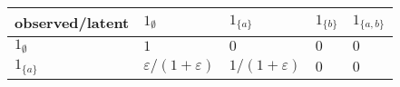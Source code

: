 \documentclass[
]{article}
\begin{document}
\begin{longtable}[]{@{}lllll@{}}
\toprule
\begin{minipage}[b]{0.10\columnwidth}\raggedright
observed/latent\strut
\end{minipage} & \begin{minipage}[b]{0.21\columnwidth}\raggedright
\(1_\emptyset\)\strut
\end{minipage} & \begin{minipage}[b]{0.20\columnwidth}\raggedright
\(1_{\{a\}}\)\strut
\end{minipage} & \begin{minipage}[b]{0.20\columnwidth}\raggedright
\(1_{\{b\}}\)\strut
\end{minipage} & \begin{minipage}[b]{0.14\columnwidth}\raggedright
\(1_{\{a,b\}}\)\strut
\end{minipage}\tabularnewline
\midrule
\endhead
\begin{minipage}[t]{0.10\columnwidth}\raggedright
\(1_\emptyset\)\strut
\end{minipage} & \begin{minipage}[t]{0.21\columnwidth}\raggedright
\(1\)\strut
\end{minipage} & \begin{minipage}[t]{0.20\columnwidth}\raggedright
\(0\)\strut
\end{minipage} & \begin{minipage}[t]{0.20\columnwidth}\raggedright
\(0\)\strut
\end{minipage} & \begin{minipage}[t]{0.14\columnwidth}\raggedright
\(0\)\strut
\end{minipage}\tabularnewline
\begin{minipage}[t]{0.10\columnwidth}\raggedright
\(1_{\{a\}}\)\strut
\end{minipage} & \begin{minipage}[t]{0.21\columnwidth}\raggedright
\(\varepsilon/(1+\varepsilon)\)\strut
\end{minipage} & \begin{minipage}[t]{0.20\columnwidth}\raggedright
\(1/(1+\varepsilon)\)\strut
\end{minipage} & \begin{minipage}[t]{0.20\columnwidth}\raggedright
\(0\)\strut
\end{minipage} & \begin{minipage}[t]{0.14\columnwidth}\raggedright
\(0\)\strut
\end{minipage}\tabularnewline

\end{longtable}
\end{document}
